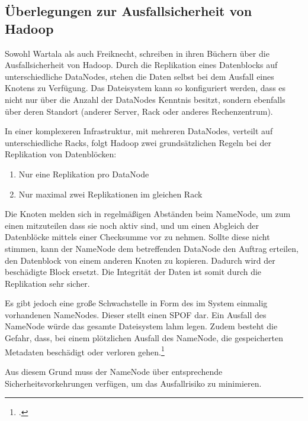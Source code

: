 
\subsection{Überlegungen zur Ausfallsicherheit von Hadoop}
Sowohl Wartala als auch Freiknecht, schreiben in ihren Büchern über die Ausfallsicherheit von Hadoop. Durch die Replikation eines Datenblocks auf unterschiedliche DataNodes, stehen die Daten selbst bei dem Ausfall eines Knotens zu Verfügung. Das Dateisystem kann so konfiguriert werden, dass es nicht nur über die Anzahl der DataNodes Kenntnis besitzt, sondern ebenfalls über deren Standort (anderer Server, Rack oder anderes Rechenzentrum).

In einer komplexeren Infrastruktur, mit mehreren DataNodes, verteilt auf unterschiedliche Racks, folgt Hadoop zwei grundsätzlichen Regeln bei der Replikation von Datenblöcken:

\begin{enumerate}
	\item Nur eine Replikation pro DataNode
	\item Nur maximal zwei Replikationen im gleichen Rack
\end{enumerate}

Die Knoten melden sich in regelmäßigen Abständen beim NameNode, um zum einen mitzuteilen dass sie noch aktiv sind, und um einen Abgleich der Datenblöcke mittels einer Checksumme vor zu nehmen. Sollte diese nicht stimmen, kann der NameNode dem betreffenden DataNode den Auftrag erteilen, den Datenblock von einem anderen Knoten zu kopieren. Dadurch wird der beschädigte Block ersetzt. Die Integrität der Daten ist somit durch die Replikation sehr sicher.

Es gibt jedoch eine große Schwachstelle in Form des im System einmalig vorhandenen NameNodes. Dieser stellt einen \ac{SPOF} dar. Ein Ausfall des NameNode würde das gesamte Dateisystem lahm legen. Zudem besteht die Gefahr, dass, bei einem plötzlichen Ausfall des NameNode, die gespeicherten Metadaten beschädigt oder verloren gehen.\footcite[Vgl.][S. 277 f.]{Wartala.2012}

Aus diesem Grund muss der NameNode über entsprechende Sicherheitsvorkehrungen verfügen, um das Ausfallrisiko zu minimieren.


